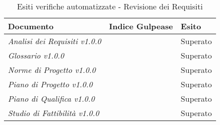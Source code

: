 \begin{table}[H]
	
	\begin{longtable}{ >{\centering}p{} >{\centering}p{}
			 >{\centering}p{}}
			
		\hline
		\rowcolorhead
		\centering\textbf{\color{white}Documento} 
		& \centering\textbf{\color{white}Indice Gulpease} 
		& \centering\textbf{\color{white}Esito}
		\tabularnewline \hline 	
		
		
		\textit{Analisi dei Requisiti v1.0.0} & & Superato
		
		\tabularnewline 
		\textit{Glossario v1.0.0} & & Superato
				
		\tabularnewline 
		\textit{Norme di Progetto v1.0.0} & & Superato
		
		\tabularnewline 
		\textit{Piano di Progetto v1.0.0} & & Superato
		
		\tabularnewline 
		\textit{Piano di Qualifica v1.0.0} & & Superato	
		
		\tabularnewline 
		\textit{Studio di Fattibilità v1.0.0} & & Superato
	
	\end{longtable}
	\caption{Esiti verifiche automatizzate - Revisione dei Requisiti}	

\end{table}